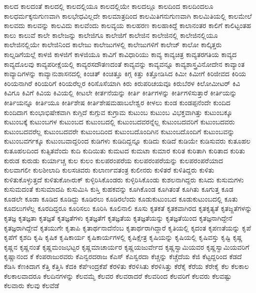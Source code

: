 {ಕಾಲದ
ಕಾಲದಂತೆ
ಕಾಲದಲ್ಲಿ
ಕಾಲದಲ್ಲಿಯೂ
ಕಾಲದಲ್ಲಿಯೇ
ಕಾಲದಲ್ಲೂ
ಕಾಲದಿಂದ
ಕಾಲದಿಂದಲೂ
ಕಾಲಧರ್ಮಕ್ಕನುಗುಣವಾಗಿ
ಕಾಲಭೇಧವಿಲ್ಲದೇ
ಕಾಲಮಾತ್ರದಿಂದ
ಕಾಲಮಿತಿಗನುಗುಣವಾಗಿ
ಕಾಲಮಿತಿಯಲ್ಲಿ
ಕಾಲಮೇಲೆ
ಕಾಲವದು
ಕಾಲವನ್ನು
ಕಾಲವಿದು
ಕಾಲವೆಂದು
ಕಾಲವ್ಯಯ
ಕಾಲಹರಣ
ಕಾಲಹಾಕಿದ್ದೆ
ಕಾಲಾನಂತರ
ಕಾಲಿಗೆ
ಕಾಲಿಟ್ಟಂತಹ
ಕಾಲು
ಕಾಲುವೆ
ಕಾಲೇ
ಕಾಲೇಜನ್ನು
ಕಾಲೇಜಿಗೂ
ಕಾಲೇಜಿಗೆ
ಕಾಲೇಜಿನ
ಕಾಲೇಜಿನಲ್ಲಿ
ಕಾಲೇಜಿನಲ್ಲಿಯೂ
ಕಾಲೇಜಿನಲ್ಲಿಯೇ
ಕಾಲೇಜಿನಿಂದ
ಕಾಲೇಜು
ಕಾಲೇಜುಗಳಲ್ಲಿ
ಕಾಲೇಜುಗಳಿಗೆ
ಕಾಲೇಜ್
ಕಾಲೋ
ಕಾಲ್ಕಿತ್ತರು
ಕಾಲ್ನಡಿಗೆಯಲ್ಲೆ
ಕಾಳಜಿ
ಕಾಳಜಿಗೆ
ಕಾಳಜಿಯೂ
ಕಾವಿಗೆ
ಕಾವಿಧಾರಿಯು
ಕಾವ್ಯ
ಕಾವ್ಯಚಿತ್ರ
ಕಾವ್ಯತರಗತಿಯ
ಕಾವ್ಯದ
ಕಾವ್ಯದೊಲವು
ಕಾವ್ಯಪರೀಕ್ಷೆಯಲ್ಲಿ
ಕಾವ್ಯರಸದೌತಣದಂತೆ
ಕಾವ್ಯವನ್ನು
ಕಾವ್ಯವನ್ನೂ
ಕಾವ್ಯಶಾಸ್ತ್ರವಿನೋದೇನ
ಕಾವ್ಯಾಂತ
ಕಾವ್ಯಾದಿಗಳನ್ನು
ಕಾವ್ಯಾನುಶಾಸನದಲ್ಲಿ
ಕಿಂಚಿತ್
ಕಿಂಚಿತ್ತೂ
ಕಿಗ್ಗ
ಕಿತ್ತು
ಕಿತ್ತೋಡಿಸಿದ
ಕಿಮೀ
ಕಿಮೀಗೆ
ಕಿರಿಜೀವದ
ಕಿರಿಯ
ಕಿರಿಯನಾಗಿರೆ
ಕಿರಿಯರಿಗೆ
ಕಿರಿಯರೆಲ್ಲರ
ಕಿರಿಸೊಸೆಯಾಗಿ
ಕಿರು
ಕಿರುಪರಿಚಯವೂ
ಕಿರುಬೆರಳ
ಕಿಲೋಮೀಟರ್
ಕಿವಿ
ಕಿವಿಗೂ
ಕಿವಿಗೆ
ಕಿವಿಯ
ಕಿವಿಯಲ್ಲಿ
ಕೀಟಲೇ
ಕೀರ್ತನೆಯನ್ನು
ಕೀರ್ತಿ
ಕೀರ್ತಿಗಳನ್ನು
ಕೀರ್ತಿಗಳಿಸುತ್ತಾರೆ
ಕೀರ್ತಿಯನ್ನು
ಕೀರ್ತಿಯನ್ನೂ
ಕೀರ್ತಿಯೂ
ಕೀರ್ತಿಶೇಷ
ಕೀರ್ತಿಶೇಷಮಹಾಬಲೇಶ್ವರ
ಕೀಳಲು
ಕುಂಡ
ಕುಂಡಪ್ಪನೆಂದೇ
ಕುಂದಿದ
ಕುಂದಿದಾಗ
ಕುಂಭಾಭಿಷೇಕವಾಗಿ
ಕುಗ್ಗಿದೆ
ಕುಗ್ಗುವ
ಕುಗ್ರಾಮ
ಕುಟುಂಬ
ಕುಟುಂಬ	ವಿಭಕ್ತವಾಗಿತ್ತು
ಕುಟುಂಬಕ್ಕೂ
ಕುಟುಂಬಕ್ಕೆ
ಕುಟುಂಬಗಳ
ಕುಟುಂಬದ
ಕುಟುಂಬದಲ್ಲಿ
ಕುಟುಂಬದವರನ್ನೆಲ್ಲ
ಕುಟುಂಬದವರಿಗೆ
ಕುಟುಂಬದವರು
ಕುಟುಂಬದವರೆಲ್ಲ
ಕುಟುಂಬದವರೇ
ಕುಟುಂಬದಿಂದ
ಕುಟುಂಬದೊಂದಿಗಿನ
ಕುಟುಂಬದೊಂದಿಗೆ
ಕುಟುಂಬವನ್ನು
ಕುಟುಂಬವರ್ಗಕ್ಕೂ
ಕುಟುಂಬವಾದ್ದರಿಂದ
ಕುಡಿಗಳು
ಕುಡಿದಿದ್ದನ್ನೂ
ಕುಡಿದು
ಕುಡಿದೆ
ಕುಡಿಯೇ
ಕುಡಿಸುವರು
ಕುತೂಹಲ
ಕುತೂಹಲದಿಂದ
ಕುತ್ಸಿತವೆಂದು
ಕುದಿ
ಕುದಿಯಿತು
ಕುಮಟದ
ಕುಮಟಾ
ಕುಮಾರ
ಕುರಿತ
ಕುರಿತಾಗಿ
ಕುರಿತಾದ
ಕುರಿತು
ಕುರುಡ
ಕುರುಡು
ಕುರ್ಯಾಚ್ಚ
ಕುಲ
ಕುಲಂ
ಕುಲಪರಂಪರೆಯ
ಕುಲಪರಂಪರೆಯನ್ನು
ಕುಲಪರಂಪರೆಯಾದ
ಕುಲವಾಗಲೀ
ಕುಲಶೀಲಾದಿ
ಕುಲಸಚಿವರು
ಕುಲಾರ್ಣವತಂತ್ರ
ಕುಲೀನರು
ಕುಳಿತರೆ
ಕುಳಿತಿದ್ದರು
ಕುಳಿತು
ಕುಳಿತುಕೊಳ್ಳುತ್ತದೆ
ಕುಳಿತುಕೋsರುಕ್
ಕುಳ್ಳಿರಿಸಿಕೊಂಡರು
ಕುಳ್ಳಿರಿಸಿಕೊಂಡು
ಕುಶಲನಾಗಿದ್ದರು
ಕುಸಿದು
ಕುಸುಮಗಳು
ಕುಸುಮದಂತೆ
ಕುಸುಮಾದಪಿ
ಕುಸುಮಿಸಿ
ಕುಸ್ತಿ
ಕುಹಕವನ್ನು
ಕೂಗಿಕೊಂಡ
ಕೂಗಿತಂತೆ
ಕೂಗಿತು
ಕೂಗುತ್ತ
ಕೂಡ
ಕೂಡಲೇ
ಕೂಡಾ
ಕೂಡಿದ
ಕೂಡಿದ್ದು
ಕೂಡಿರಲು
ಕೂಡಿರಲೆಂದು
ಕೂಡುಕುಟುಂಬದ
ಕೂಡುಕುಟುಂಬದಲ್ಲಿ
ಕೂತು
ಕೂದಲುಗಳೆಲ್ಲ
ಕೂರದಿದ್ದರೂ
ಕೂರಿಸಲು
ಕೂರಿಸಿ
ಕೂಲಿನಾಲಿ
ಕೂಸು
ಕೃತಕತೆ
ಕೃತಕವಾಗಿರದ
ಕೃತಕೃತ್ಯತೆ
ಕೃತಜ್ಙತೆಗಳನ್ನು
ಕೃತಜ್ಞ
ಕೃತಜ್ಞತಾ
ಕೃತಜ್ಞತೆ
ಕೃತಜ್ಞತೆಗಳು
ಕೃತಜ್ಞತೆಗೆ
ಕೃತಜ್ಞತೆಯ
ಕೃತಜ್ಞತೆಯನ್ನು
ಕೃತಜ್ಞತೆಯಿಂದ
ಕೃತಜ್ಞನಾಗಿದ್ದೇನೆ
ಕೃತಜ್ಞರಾಗಿದ್ದೇವೆ
ಕೃತಯುಗೇ
ಕೃತಾಪಿ
ಕೃತಾರ್ಥನಾದೆನೆಂಬ
ಕೃತಾರ್ಥರಾಗಿದ್ದಾರೆ
ಕೃತಿಯಲ್ಲಿ
ಕೃದಂತ
ಕೃಪಣತೆಯನ್ನು
ಕೃಪೆ
ಕೃಪೆಗೆ
ಕೃಶದಿ
ಕೃಷಿ
ಕೃಷಿಕ
ಕೃಷಿಕಾರ್ಯ
ಕೃಷಿಕಾರ್ಯಗಳಲ್ಲಿ
ಕೃಷಿಕ್ಷೇತ್ರ
ಕೃಷಿಯನ್ನು
ಕೃಷಿಯಲ್ಲಿ
ಕೃಷಿವಸ್ತು
ಕೃಷ್ಟಿ
ಕೃಷ್ಣ
ಕೃಷ್ಣನ
ಕೃಷ್ಣನಂತೆ
ಕೃಷ್ಣಮಂಜಭಟ್ಟರ
ಕೃಷ್ಣಮಾಚಾರ್ಯರ
ಕೃಷ್ಣಯಜುರ್ವೇದ
ಕೃಷ್ಣಸ್ವಾಮಿಯವರ
ಕೃಷ್ಣಸ್ವಾಮಿಯವರಿಗೆ
ಕೃಷ್ಣಾನಂದ
ಕೆ
ಕೆಂಪರಾಜುರವರು
ಕೆಎನ್ವರದರಾಜ
ಕೆಎಸ್
ಕೆಎಸ್ವರದಾ
ಕೆಚ್ಚನ್ನು
ಕೆಚ್ಚೆದೆಯ
ಕೆಜಿ
ಕೆಟ್ಟದ್ದರಿಂದ
ಕೆಡದೆ
ಕೆಡಿಸಿ
ಕೆಣಕಿದಾಗ
ಕೆತ್ತಿ
ಕೆತ್ತಿಸಿ
ಕೆದಕಿ
ಕೆಪೆಇಂದ್ರಕೆಪೆ
ಕೆರಳಿತು
ಕೆರಳಿಸಿತು
ಕೆರಳಿಸಿತ್ತು
ಕೆರೆಕೈ
ಕೆರೆಯ
ಕೆರೇಕೈ
ಕೆಲ
ಕೆಲಕಾಲ
ಕೆಲಕಾಲವಾದರೂ
ಕೆಲದಿನಗಳನ್ನು
ಕೆಲವಮ್ಮೆ
ಕೆಲವರ
ಕೆಲವರಾದರೆ
ಕೆಲವರಿಂದ
ಕೆಲವರಿಗೆ
ಕೆಲವರು
ಕೆಲವಷ್ಟು
ಕೆಲವಾರು
ಕೆಲವು
ಕೆಲವೆಡೆ
}
